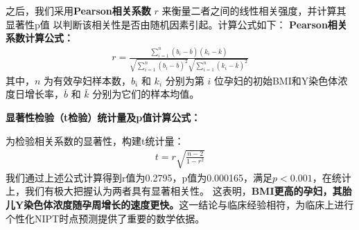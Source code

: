 \documentclass{article}
\begin{document}
之后，我们采用\textbf{Pearson相关系数} $r$ 来衡量二者之间的线性相关强度，并计算其显著性p值
以判断该相关性是否由随机因素引起。计算公式如下：
\textbf{Pearson相关系数计算公式：}
\begin{gather}
    r=\frac{\sum_{i=1}^{n}(b_i-\overline{b})(k_i-\overline{k})}{\sqrt{\sum_{i=1}^{n}(b_i-\overline{b})^2}\sqrt{\sum_{i=1}^{n}(k_i-\overline{k})^2}} \tag{2}
\end{gather}
其中，$n$ 为有效孕妇样本数，$b_i$ 和 $k_i$ 分别为第 $i$ 位孕妇的初始BMI和Y染色体浓度日增长率，$\overline{b}$ 和 $\bar{k}$ 分别为它们的样本均值。

\textbf{显著性检验（t检验）统计量及p值计算公式：}

为检验相关系数的显著性，构建t统计量：
\begin{gather}
    t=r\sqrt{\frac{n-2}{1-r^2}}\tag{3}
\end{gather}
我们通过上述公式计算得到r值为0.2795，p值为0.000165，满足$p < 0.001$，在统计上，我们有极大把握认为两者具有显著相关性。
这表明，\textbf{BMI更高的孕妇，其胎儿Y染色体浓度随孕周增长的速度更快。}这一结论与临床经验相符，为临床上进行个性化NIPT时点预测提供了重要的数学依据。
\end{document}
